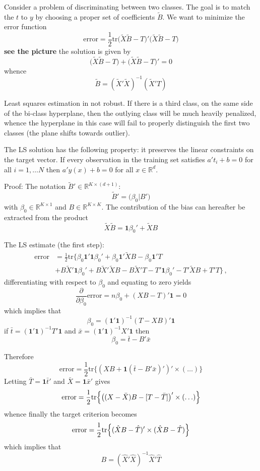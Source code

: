 \documentclass[a4paper]{article}
\newcommand{\Real}{\mathbb{R}}
\newcommand{\tr}{\text{tr}}
\newcommand{\one}{\mathbf{1}}
\begin{document}
Consider a problem of discriminating between two classes. The goal is to match the $t$
to $y$ by choosing a proper set of coefficients $\tilde{B}$. We want to minimize the
error function
\[\text{error} = \frac{1}{2} \tr \bigl(\tilde{X}\tilde{B} - T\bigr)'\bigl(\tilde{X}\tilde{B} - T\bigr)\]
\textbf{see the picture}
the solution is given by
\[
\bigl(\tilde{X}\tilde{B} - T\bigr)
+ \bigl(\tilde{X}\tilde{B} - T\bigr)'
= 0
\]
whence 
\[\tilde{B} = (\tilde{X}'\tilde{X})^{-1}(\tilde{X}'T)\]

Least squares estimation in not robust. If there is a third class, on the same
side of the bi-class hyperplane, then the outlying class will be much heavily
penalized, whence the hyperplane in this case will fail to properly distinguish
the first two classes (the plane shifts towards outlier).

The LS solution has the following property: it preserves the linear constraints
on the target vector. If every observation in the training set satisfies $a't_i + b = 0$
for all $i=1,\ldots N$ then $a'y(x) + b = 0$ for all $x\in \Real^d$.

Proof:
The notation $\tilde{B}'\in \Real^{K\times (d+1)}$:
\[\tilde{B}' = \bigl(\beta_0 \rvert B'\bigr)\]
with $\beta_0\in \Real^{K\times 1}$ and $B\in \Real^{K\times K}$.
The contribution of the bias can hereafter be extracted from the product
\[\tilde{X}\tilde{B} = \one\beta_0' + \tilde{X}B\]

The LS estimate (the first step):
\begin{align*}
\text{error}
	&= \frac{1}{2} \tr\bigl\{
		\beta_0\one'\one\beta_0' + \beta_0\one'\tilde{X}B - \beta_0\one'T \\
	&+ B\tilde{X}'\one\beta_0' + B\tilde{X}'\tilde{X}B - B\tilde{X}'T
		- T'\one\beta_0' - T'\tilde{X}B + T'T
	\bigr\} \,,
\end{align*}
differentiating with respect to $\beta_0$ and equating to zero yields
\[
\frac{\partial}{\partial \beta_0} \text{error} 
= n\beta_0 + (XB-T)'\one
= 0
\]
which implies that 
\[
\beta_0 = (\one'\one)^{-1} (T-XB)'\one
\]
if $\bar{t} = (\one'\one)^{-1}T'\one$ and $\bar{x} = (\one'\one)^{-1}X'\one$ 
then
\[\beta_0 = \bar{t} - B'\bar{x}\]

Therefore
\[
\text{error}
= \frac{1}{2} \tr\bigl\{ (XB + \one( \bar{t} - B'\bar{x} )' )' \times ( \ldots ) \bigr\}
\]
Letting $\bar{T} = \one \bar{t}'$ and $\bar{X} = \one \bar{x}'$ gives
\[
\text{error}
= \frac{1}{2} \tr\Bigl\{ \bigl( (X-\bar{X}) B - [T-\bar{T}] \bigr)' \times (\ldots) \Bigr\}
\]
whence finally the target criterion becomes
\[
\text{error}
= \frac{1}{2} \tr\Bigl\{ ( \hat{X} B - \hat{T} )' \times ( \hat{X} B - \hat{T} ) \Bigr\}
\]
which implies that 
\[B = (\hat{X}'\hat{X})^{-1}\hat{X}'\hat{T}\]
\end{document}
